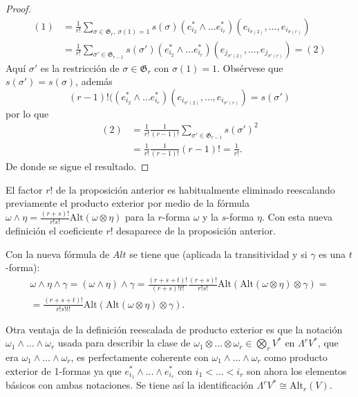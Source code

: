 \documentclass[\main/VD_completo.tex]{subfiles}
\begin{document}
\begin{proof}
\begin{equation}
  \label{proof:prop-alt-2}
  \begin{aligned}
  (1) &= \frac{1}{r!} \sum_{\sigma\in \mathfrak{G}_r, \ \sigma(1)=1}
    s(\sigma)(e_{i_2}^{*} \wedge \dots e_{i_r}^{*})
    (e_{i_{\sigma(2)}}, \dots, e_{i_{\sigma(r)}})\\
    &=\frac{1}{r!} \sum_{\sigma'\in \mathfrak{G}_{r-1}} s(\sigma')(e_{i_2}^{*} \wedge \dots
    e_{i_r}^{*}) (e_{j_{\sigma'(2)}}, \dots, e_{j_{\sigma'(r)}}) = (2)
  \end{aligned}
\end{equation}
 Aquí \(\sigma'\) es la restricción de \(\sigma \in \mathfrak{G}_r\) con \(\sigma(1) = 1\). Obsérvese que \( s(\sigma')= s(\sigma) \), además  
\[
(r-1)!((e_{i_2}^*\wedge\ldots e_{i_r}^*)(e_{i_{\sigma'(2)}},\ldots, e_{i_{\sigma'(r)}})= s(\sigma')
\]
por lo que
\begin{align*}
(2) &=\frac{1}{r!}\frac{1}{(r-1)!}\sum_{\sigma'\in \mathfrak{G}_{r-1}}s(\sigma')^2\\
&=\frac{1}{r!}\frac{1}{(r-1)!}(r-1)! =\frac{1}{r!}.
\end{align*}
De donde se sigue el resultado.
\end{proof}

\begin{remark}\label{rem:reescalado}
  El factor \(r!\) de la proposición anterior es habitualmente eliminado reescalando previamente el producto exterior por medio de la fórmula
  \(\omega\wedge\eta=\frac{(r+s)!}{r!s!}\text{Alt}(\omega\otimes\eta)\) para la
  \(r\)-forma \(\omega\) y la \(s\)-forma \(\eta\). Con esta nueva definición el
  coeficiente \(r!\) desaparece de la proposición anterior.

  Con la nueva fórmula de \(Alt\) se tiene que (aplicada la transitividad y si
  \(\gamma\) es una $t$-forma):
  \[\begin{array}{c}
      \omega\wedge\eta\wedge\gamma=(\omega\wedge\eta)\wedge\gamma=
      \frac{(r+s+t)!}{(r+s)!t!}\frac{(r+s)!}{r!s!}\text{Alt}
      (\text{Alt}(\omega\otimes\eta)\otimes\gamma)= \\
      =\frac{(r+s+t)!}{r!s!t!}\text{Alt}(\text{Alt}(\omega\otimes\eta)\otimes\gamma).
    \end{array}\]
\end{remark}

\begin{remark}
  Otra ventaja de la definición reescalada de producto exterior es que la
  notación \(\omega_1\wedge \ldots \wedge \omega_r\) usada para describir la clase de
  \(\omega_{1}\otimes\dots\otimes\omega_{r}\in\bigotimes_{r}V^{*}\) en
  \(\Lambda^{r}V^{*}\), que era \(\omega_{1}\wedge\dots\wedge\omega_{r}\), es perfectamente 
  coherente con \(\omega_{1}\wedge\dots\wedge\omega_{r}\) como producto exterior
  de 1-formas ya que \(e_{i_{1}}^{*}\wedge\dots\wedge e_{i_{r}}^{*}\) con
  \(i_{1}<\dots<i_{r}\) son ahora los elementos básicos con ambas notaciones. Se
  tiene así la identificación \(\Lambda^{r}V^{*}\cong\text{Alt}_{r}(V)\).
\end{remark}
\end{document}
